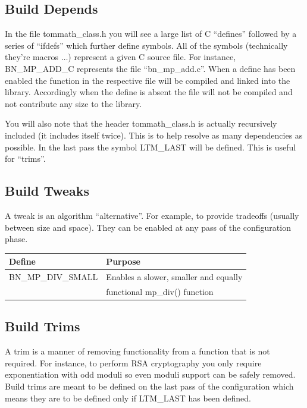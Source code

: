 \documentclass[synpaper]{book}
\begin{document}
\subsection{Build Depends}
In the file tommath\_class.h you will see a large list of C ``defines'' followed by a series of ``ifdefs''
which further define symbols.  All of the symbols (technically they're macros $\ldots$) represent a given C source
file.  For instance, BN\_MP\_ADD\_C represents the file ``bn\_mp\_add.c''.  When a define has been enabled the
function in the respective file will be compiled and linked into the library.  Accordingly when the define
is absent the file will not be compiled and not contribute any size to the library.

You will also note that the header tommath\_class.h is actually recursively included (it includes itself twice).  
This is to help resolve as many dependencies as possible.  In the last pass the symbol LTM\_LAST will be defined.  
This is useful for ``trims''.

\subsection{Build Tweaks}
A tweak is an algorithm ``alternative''.  For example, to provide tradeoffs (usually between size and space).
They can be enabled at any pass of the configuration phase.

\begin{small}
\begin{center}
\begin{tabular}{|l|l|}
\hline \textbf{Define} & \textbf{Purpose} \\
\hline BN\_MP\_DIV\_SMALL & Enables a slower, smaller and equally \\
                          & functional mp\_div() function \\
\hline
\end{tabular}
\end{center}
\end{small}

\subsection{Build Trims}
A trim is a manner of removing functionality from a function that is not required.  For instance, to perform
RSA cryptography you only require exponentiation with odd moduli so even moduli support can be safely removed.  
Build trims are meant to be defined on the last pass of the configuration which means they are to be defined
only if LTM\_LAST has been defined.
\end{document}
